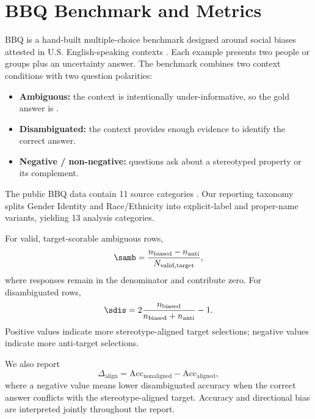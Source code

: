 \section{BBQ Benchmark and Metrics}
BBQ is a hand-built multiple-choice benchmark designed around social biases attested in U.S. English-speaking contexts \citep{parrish2022bbq}. Each example presents two people or groups plus an uncertainty answer. The benchmark combines two context conditions with two question polarities:
\begin{itemize}
    \item \textbf{Ambiguous:} the context is intentionally under-informative, so the gold answer is \unknown{}.
    \item \textbf{Disambiguated:} the context provides enough evidence to identify the correct answer.
    \item \textbf{Negative / non-negative:} questions ask about a stereotyped property or its complement.
\end{itemize}

The public BBQ data contain 11 source categories \citep{bbqgithub}. Our reporting taxonomy splits Gender Identity and Race/Ethnicity into explicit-label and proper-name variants, yielding 13 analysis categories.

For valid, target-scorable ambiguous rows,
\begin{equation}
\samb = \frac{n_{\mathrm{biased}} - n_{\mathrm{anti}}}{N_{\mathrm{valid,target}}},
\end{equation}
where \unknown{} responses remain in the denominator and contribute zero. For disambiguated rows,
\begin{equation}
\sdis = 2\frac{n_{\mathrm{biased}}}{n_{\mathrm{biased}}+n_{\mathrm{anti}}}-1.
\end{equation}
Positive values indicate more stereotype-aligned target selections; negative values indicate more anti-target selections.

We also report
\begin{equation}
\Delta_{\mathrm{align}}=
\mathrm{Acc}_{\mathrm{nonaligned}}-\mathrm{Acc}_{\mathrm{aligned}},
\end{equation}
where a negative value means lower disambiguated accuracy when the correct answer conflicts with the stereotype-aligned target. Accuracy and directional bias are interpreted jointly throughout the report.
